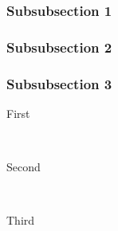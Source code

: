 \documentclass[12pt]{article} %
\begin{document}
\subsubsection{Subsubsection 1} %



\subsubsection{Subsubsection 2} %



\subsubsection{Subsubsection 3} %

\begin{description} %

\item[First] \hfill \\

\item[Second] \hfill \\

\item[Third] \hfill \\

\end{description} 






\end{document}
